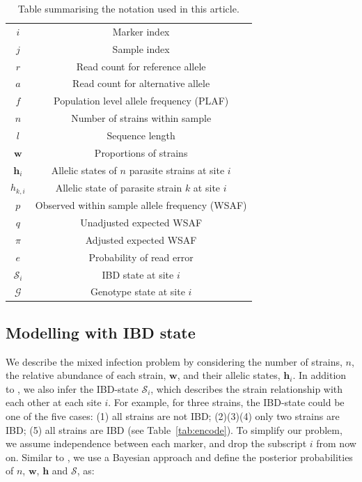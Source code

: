 \documentclass[9pt]{article}
\begin{document}
\begin{table}[htb]\centering
\begin{tabular}{c|c}\hline
$i$              & Marker index\\
$j$              & Sample index \\
$r$              & Read count for reference allele \\
$a$              & Read count for alternative allele \\
$f$              & Population level allele frequency (PLAF) \\
$n$              & Number of strains within sample \\
$l$              & Sequence length \\
$\mathbf{w}$      & Proportions of strains \\
$\mathbf{h}_{i}$ & Allelic states of $n$ parasite strains at site $i$ \\
$h_{k,i}$   & Allelic state of parasite strain $k$ at site $i$\\
$p$              & Observed within sample allele frequency (WSAF) \\
$q$              & Unadjusted expected WSAF  \\
$\pi$            & Adjusted expected WSAF \\
$e$              & Probability of read error\\
$\mathcal{S}_{i}$ & IBD state at site $i$ \\
$\mathcal{G}$ & Genotype state at site $i$ \\
\hline
\end{tabular}
\vspace{.2cm}
\caption{Table summarising the notation used in this article.}\label{tab:notation}
\end{table}

\subsection{Modelling with IBD state}
We describe the mixed infection problem by considering the number of strains, $n$, the relative abundance of each strain, $\mathbf{w}$, and their allelic states, $\mathbf{h}_{i}$. In addition to \citet{Zhu2017}, we also infer the IBD-state $\mathcal{S}_{i}$, which describes the strain relationship with each other at each site $i$. For example, for three strains, the IBD-state could be one of the five cases: (1) all strains are not IBD; (2)(3)(4) only two strains are IBD; (5) all strains are IBD (see Table~\ref{tab:encode}). To simplify our problem, we assume independence between each marker, and drop the subscript $i$ from now on. Similar to \citet{Jack2016}, we use a Bayesian approach and define the posterior probabilities of $n$, $\mathbf{w}$, $\mathbf{h}$ and $\mathcal{S}$,  as:
\end{document}
